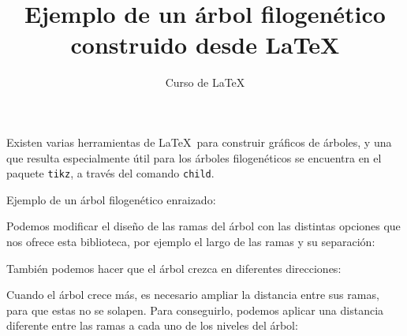 \documentclass[12pt,letterpaper]{article}
\author{Curso de \LaTeX}
\title{Ejemplo de un árbol filogenético construido desde \LaTeX}
\begin{document}
\maketitle
Existen varias herramientas de \LaTeX\ para construir gráficos de árboles, y una que resulta especialmente útil para los árboles filogenéticos se encuentra en el paquete  \texttt{tikz}, a través del comando \texttt{child}.

Ejemplo de un árbol filogenético enraizado:

\begin{center}
\end{center}

Podemos modificar el diseño de las ramas del árbol con las distintas opciones que nos ofrece esta biblioteca, por ejemplo el largo de las ramas y su separación:

\begin{center}

\end{center}

También podemos hacer que el árbol crezca en diferentes direcciones:

\begin{center}
\end{center}

Cuando el árbol crece más, es necesario ampliar la distancia entre sus ramas, para que estas no se solapen. Para conseguirlo, podemos aplicar una distancia diferente entre las ramas a cada uno de los niveles del árbol:
\end{document}
